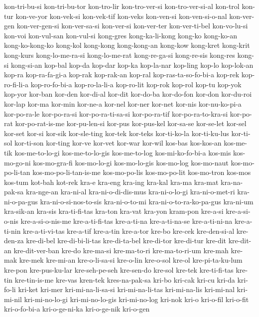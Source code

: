 {kon-tri-bu-si kon-tri-bu-tor kon-tro-lir kon-tro-ver-si kon-tro-ver-si-al
kon-trol kon-tur kon-ve-yor kon-vek-si kon-vek-tif kon-veks kon-ven-si
kon-ven-si-o-nal kon-ver-gen kon-ver-gen-si kon-ver-sa-si kon-ver-si
kon-ver-ter kon-ver-ti-bel kon-vo-lu-si kon-voi kon-vul-san kon-vul-si
kong-gres kong-ka-li-kong kong-ko kong-ko-an kong-ko-kong-ko kong-kol
kong-kong kong-kong-an kong-kow kong-kret kong-krit kong-kurs
kong-lo-me-ra-si kong-lo-me-rat kong-re-ga-si kong-re-sis kong-res kong-si
kong-si-an kop-bal kop-da kop-dar kop-ka kop-la-nar kop-ling kop-lo
kop-lok-an kop-ra kop-ra-fa-gi-a kop-rak kop-rak-an kop-ral
kop-ras-ta-so-fo-bi-a kop-rek kop-ro-fi-li-a kop-ro-fo-bi-a kop-ro-la-li-a
kop-ro-lit kop-rok kop-rol kop-tu kop-yok kop-yor kor-ban kor-den
kor-di-al kor-dit kor-do-ba kor-do-fon kor-don kor-du-roi kor-lap kor-ma
kor-min kor-ne-a kor-nel kor-ner kor-net kor-nis kor-nu-ko-pi-a
kor-po-ra-le kor-po-ra-si kor-po-ra-ti-sa-si kor-po-ra-tif
kor-po-ra-to-kra-si kor-po-rat kor-po-rat-is-me kor-pu-len-si kor-pus
kor-pus-kel kor-sa-se kor-se-let kor-sel kor-set kor-si kor-sik
kor-sle-ting kor-tek kor-teks kor-ti-ko-la kor-ti-ku-lus kor-ti-sol
kor-ti-son kor-ting kor-ve kor-vet kor-war kor-wil kos-bas kos-kos-an
kos-me-tik kos-me-to-lo-gi kos-me-to-lo-gis kos-me-to-log
kos-mi-ko-fo-bi-a kos-mis kos-mo-go-ni kos-mo-gra-fi kos-mo-lo-gi
kos-mo-lo-gis kos-mo-log kos-mo-naut kos-mo-po-li-tan
kos-mo-po-li-tan-is-me kos-mo-po-lis kos-mo-po-lit kos-mo-tron kos-mos
kos-tum kot-bah kot-rek kra-e kra-eng kra-ing kra-kal kra-ma kra-mat
kra-na-pak-sa kra-nge-an kra-ni-al kra-ni-o-di-dis-mus kra-ni-o-lo-gi
kra-ni-o-met-ri kra-ni-o-pa-gus kra-ni-o-si-nos-to-sis kra-ni-o-to-mi
kra-ni-o-to-ra-ko-pa-gus kra-ni-um kra-sik-an kra-sis kra-ti-fi-tas
kra-ton kra-vat kra-yon kram-pon kre-a-si kre-a-si-o-nis kre-a-si-o-nis-me
kre-a-ti-fi-tas kre-a-ti-na kre-a-ti-na-se kre-a-ti-ni-na kre-a-ti-nin
kre-a-ti-vi-tas kre-a-tif kre-a-tin kre-a-tor kre-bo kre-cek kre-den-si-al
kre-den-za kre-di-bel kre-di-bi-li-tas kre-di-ta-bel kre-di-tor kre-di-tur
kre-dit kre-dit-an kre-dit-ver-ban kre-do kre-ma-si kre-ma-to-ri
kre-ma-to-ri-um kre-mah kre-mak kre-mek kre-mi-an kre-o-li-sa-si kre-o-lin
kre-o-sol kre-ol kre-pi-ta-ku-lum kre-pon kre-pus-ku-lar kre-seh-pe-seh
kre-sen-do kre-sol kre-tek kre-ti-fi-tas kre-tin kre-tin-is-me kre-vas
kren-tek kres-na-pak-sa kri-bo kri-cak kri-cu kri-da kri-fo-li kri-ket
kri-mer kri-mi-na-li-sa-si kri-mi-na-li-tas kri-mi-na-lis kri-mi-nal
kri-mi-nil kri-mi-no-lo-gi kri-mi-no-lo-gis kri-mi-no-log kri-nok kri-o
kri-o-fil kri-o-fit kri-o-fo-bi-a kri-o-ge-ni-ka kri-o-ge-nik kri-o-gen
}
